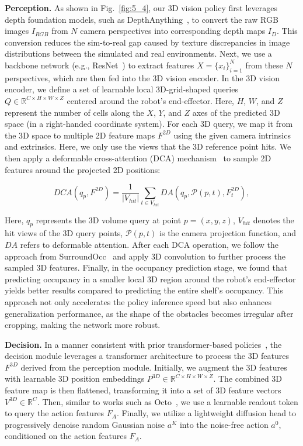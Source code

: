 \textbf{Perception.} As shown in Fig.~\ref{fig:5_4}, our 3D vision policy first leverages depth foundation models, such as DepthAnything~\cite{yang2024depth}, to convert the raw RGB images $I_{RGB}$ from $N$ camera perspectives into corresponding depth maps $I_{D}$. This conversion reduces the sim-to-real gap caused by texture discrepancies in image distributions between the simulated and real environments. Next, we use a backbone network (e.g., ResNet~\cite{he2016deep}) to extract features $X = \{x_i\}_{i=1}^N$ from these $N$ perspectives, which are then fed into the 3D vision encoder. In the 3D vision encoder, we define a set of learnable local 3D-grid-shaped queries $Q \in \mathbb{R}^{C \times H \times W \times Z}$ centered around the robot’s end-effector. Here, $H$, $W$, and $Z$ represent the number of cells along the $X$, $Y$, and $Z$ axes of the predicted 3D space (in a right-handed coordinate system). For each 3D query, we map it from the 3D space to multiple 2D feature maps $F^{2D}$ using the given camera intrinsics and extrinsics. Here, we only use the views that the 3D reference point hits. We then apply a deformable cross-attention (DCA) mechanism~\cite{zhu2020deformable} to sample 2D features around the projected 2D positions:

$$DCA(q_p,F^{2D})=\frac{1}{|V_{hit}|}\sum_{t\in V_{hit}}DA(q_p,\mathcal{P}(p,t),F_t^{2D}),$$

Here, $q_p$ represents the 3D volume query at point $p = (x, y, z)$, $V_{hit}$ denotes the hit views of the 3D query points, $\mathcal{P}(p,t)$ is the camera projection function, and $DA$ refers to deformable attention. After each DCA operation, we follow the approach from SurroundOcc~\cite{wei2023surroundocc} and apply 3D convolution to further process the sampled 3D features. Finally, in the occupancy prediction stage, we found that predicting occupancy in a smaller local 3D region around the robot’s end-effector yields better results compared to predicting the entire shelf's occupancy. This approach not only accelerates the policy inference speed but also enhances generalization performance, as the shape of the obstacles becomes irregular after cropping, making the network more robust.

\textbf{Decision.} In a manner consistent with prior transformer-based policies~\cite{team2024octo,kim24openvla,wang2024rise}, the decision module leverages a transformer architecture to process the 3D features \( F^{3D} \) derived from the perception module. Initially, we augment the 3D features with learnable 3D position embeddings \( P^{3D} \in \mathbb{R}^{C \times H \times W \times Z} \). The combined 3D feature map is then flattened, transforming it into a set of 3D feature vectors \( V^{3D} \in \mathbb{R}^{C} \). Then, similar to works such as Octo~\cite{team2024octo}, we use a learnable readout token to query the action features \( F_A \). Finally, we utilize a lightweight diffusion head to progressively denoise random Gaussian noise $a^K$ into the noise-free action \( a^0 \), conditioned on the action features \( F_A \).

